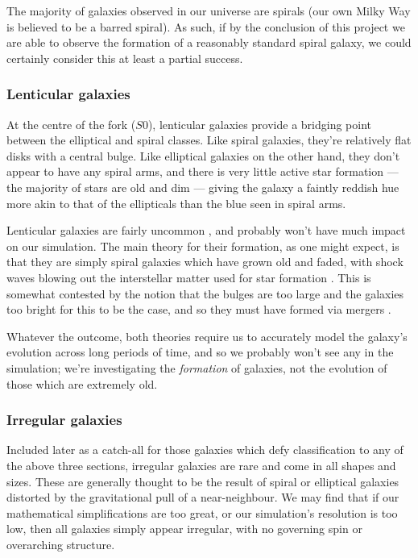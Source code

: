 \documentclass[11pt,a4paper]{article}
\begin{document}
The majority of galaxies observed in our universe are spirals \cite{morphology} (our own Milky Way is believed to be a barred spiral). As such, if by the conclusion of this project we are able to observe the formation of a reasonably standard spiral galaxy, we could certainly consider this at least a partial success.

\subsubsection{Lenticular galaxies}
At the centre of the fork ($S0$), lenticular galaxies provide a bridging point between the elliptical and spiral classes. Like spiral galaxies, they're relatively flat disks with a central bulge. Like elliptical galaxies on the other hand, they don't appear to have any spiral arms, and there is very little active star formation --- the majority of stars are old and dim --- giving the galaxy a faintly reddish hue more akin to that of the ellipticals than the blue seen in spiral arms.

Lenticular galaxies are fairly uncommon \cite{morphology}, and probably won't have much impact on our simulation. The main theory for their formation, as one might expect, is that they are simply spiral galaxies which have grown old and faded, with shock waves blowing out the interstellar matter used for star formation \cite{tully}. This is somewhat contested by the notion that the bulges are too large and the galaxies too bright for this to be the case, and so they must have formed via mergers \cite{lentform}. 

Whatever the outcome, both theories require us to accurately model the galaxy's evolution across long periods of time, and so we probably won't see any in the simulation; we're investigating the \emph{formation} of galaxies, not the evolution of those which are extremely old.

\subsubsection{Irregular galaxies}
Included later as a catch-all for those galaxies which defy classification to any of the above three sections, irregular galaxies are rare and come in all shapes and sizes. These are generally thought to be the result of spiral or elliptical galaxies distorted by the gravitational pull of a near-neighbour. We may find that if our mathematical simplifications are too great, or our simulation's resolution is too low, then all galaxies simply appear irregular, with no governing spin or overarching structure.
\end{document}
